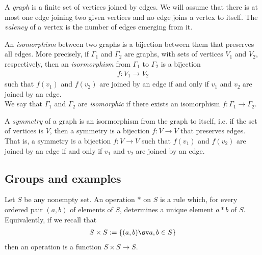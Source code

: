 \documentclass{article}
\begin{document}
\begin{definition}
	A \emph{graph} is a finite set of vertices joined by edges. We will
	assume that there is at most one edge joining two given vertices and
	no edge joins a vertex to itself. The \emph{valency} of a vertex
	is the number of edges emerging from it.
\end{definition}

\setcounter{theorem}{2}
\begin{definition}
	An \emph{isomorphism} between two graphs is a bijection between them
	that preserves all edges. More precisely, if $\Gamma_1$ and $\Gamma_2$
	are graphs, with sets of vertices $V_1$ and $V_2$, respectively, then
	an \emph{isormorphism} from $\Gamma_1$ to $\Gamma_2$ is a bijection
	\begin{align*}
		f:V_1\to V_2
	\end{align*}
	such that $f(v_1)$ and $f(v_2)$ are joined by an edge if and only if
	$v_1$ and $v_2$ are joined by an edge.\\
	We say that $\Gamma_1$ and $\Gamma_2$ are \emph{isomorphic} if there
	exists an isomorphism $f:\Gamma_1\to \Gamma_2$.
\end{definition}

\setcounter{theorem}{8}
\begin{definition}
	A \emph{symmetry} of a graph is an isormorphism from the graph to
	itself, i.e. if the set of vertices is $V$, then a symmetry is a
	bijection $f:V\to V$ that preserves edges. That is, a symmetry is
	a bijection $f:V\to V$ such that $f(v_1)$ and $f(v_2)$ are joined
	by an edge if and only if $v_1$ and $v_2$ are joined by an edge.
\end{definition}

\subsection{Groups and examples}

\begin{definition}
	Let $S$ be any nonempty set. An operation $*$ on $S$ is a rule
	which, for every ordered pair $(a,b)$ of elements of $S$, determines
	a unique element $a* b$ of $S$. Equivalently, if we recall that
	\begin{align*}
		S\times S := \{(a,b) \sv a,b\in S\}
	\end{align*}
	then an operation is a function $S\times S\to S$.
\end{definition}
\end{document}
